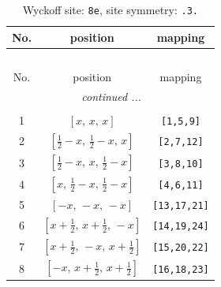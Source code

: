 \documentclass[fleqn,8pt]{jsarticle}
\begin{document}
\renewcommand{\arraystretch}{1.2}
\begin{longtable}{ccc}
\caption{Wyckoff site: {\tt 8e}, site symmetry: {\tt .3.}}
 \\
 \hline \hline
No. & position & mapping \\ \hline \endfirsthead

\multicolumn{2}{l}{\tablename\ \thetable{}} \\
 \hline \hline
No. & position & mapping \\ \hline \endhead

 \hline \hline
\multicolumn{2}{r}{\footnotesize\it continued ...} \\ \endfoot

 \hline \hline
\multicolumn{2}{r}{} \\ \endlastfoot

1 & $\left[ x,\, x,\, x \right]$ & {\tt [1,5,9]} \\ \hline
2 & $\left[ \frac{1}{2} - x,\, \frac{1}{2} - x,\, x \right]$ & {\tt [2,7,12]} \\ \hline
3 & $\left[ \frac{1}{2} - x,\, x,\, \frac{1}{2} - x \right]$ & {\tt [3,8,10]} \\ \hline
4 & $\left[ x,\, \frac{1}{2} - x,\, \frac{1}{2} - x \right]$ & {\tt [4,6,11]} \\ \hline
5 & $\left[ - x,\, - x,\, - x \right]$ & {\tt [13,17,21]} \\ \hline
6 & $\left[ x + \frac{1}{2},\, x + \frac{1}{2},\, - x \right]$ & {\tt [14,19,24]} \\ \hline
7 & $\left[ x + \frac{1}{2},\, - x,\, x + \frac{1}{2} \right]$ & {\tt [15,20,22]} \\ \hline
8 & $\left[ - x,\, x + \frac{1}{2},\, x + \frac{1}{2} \right]$ & {\tt [16,18,23]} \\
\end{longtable}
\renewcommand{\arraystretch}{1.2}
\end{document}
